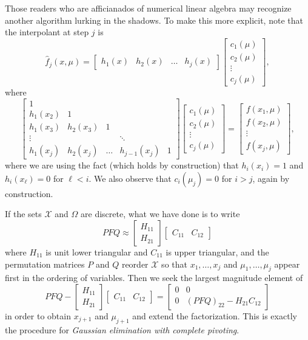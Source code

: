 \documentclass[12pt, leqno]{article} %
\begin{document}
Those readers who are afficianados of numerical linear algebra may
recognize another algorithm lurking in the shadows.
To make this more explicit, note that the interpolant at step $j$ is
\[
\hat{f}_j(x, \mu) =
\begin{bmatrix} h_1(x) & h_2(x) & \ldots & h_j(x) \end{bmatrix}
\begin{bmatrix} c_1(\mu) \\ c_2(\mu) \\ \vdots \\ c_j(\mu) \end{bmatrix},
\]
where
\[
  \begin{bmatrix}
      1 \\
      h_1(x_2) & 1 \\
      h_1(x_3) & h_2(x_3) & 1 \\
      \vdots  &          & & \ddots \\
      h_1(x_j) & h_2(x_j) & \hdots & h_{j-1}(x_j) & 1
  \end{bmatrix}
  \begin{bmatrix} c_1(\mu) \\ c_2(\mu) \\ \vdots \\ c_j(\mu) \end{bmatrix} =
  \begin{bmatrix}
    f(x_1, \mu) \\ f(x_2, \mu) \\ \vdots \\ f(x_j, \mu)
  \end{bmatrix},
\]
where we are using the fact (which holds by construction)
that $h_i(x_i) = 1$ and $h_i(x_\ell) = 0$ for $\ell < i$.  We also
observe that $c_i(\mu_j) = 0$ for $i > j$, again by construction.

If the sets $\mathcal{X}$ and $\Omega$ are discrete, what we have done
is to write
\[
  P F Q \approx
  \begin{bmatrix} H_{11} \\ H_{21} \end{bmatrix}
  \begin{bmatrix} C_{11} & C_{12} \end{bmatrix}
\]
where $H_{11}$ is unit lower triangular and $C_{11}$ is upper
triangular, and the permutation matrices $P$ and $Q$ reorder
$\mathcal{X}$ so that $x_1, \ldots, x_j$ and $\mu_1, \ldots, \mu_j$
appear first in the ordering of variables.  Then we seek the largest
magnitude element of
\[
  PFQ -
  \begin{bmatrix} H_{11} \\ H_{21} \end{bmatrix}
  \begin{bmatrix} C_{11} & C_{12} \end{bmatrix} =
  \begin{bmatrix} 0 & 0 \\ 0 & (PFQ)_{22} - H_{21} C_{12} \end{bmatrix}
\]
in order to obtain $x_{j+1}$ and $\mu_{j+1}$ and extend the
factorization.  This is exactly the procedure for
{\em Gaussian elimination with complete pivoting}.
\end{document}

